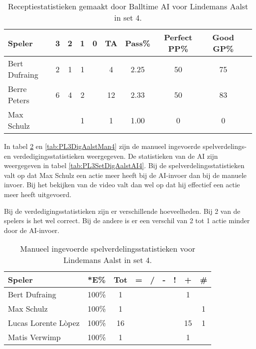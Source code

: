 \begin{table}[ht!]
  \centering
  \scriptsize
    \begin{tabular}{|l|c|c|c|c|c|c|c|c|c|} \hline
    \textbf{Speler} & 3 & 2 & 1 & 0 & TA & Pass\% & Perfect PP\% & Good GP\% \\ \hline
    Bert Dufraing & 2 & 1 & 1 &   & 4 & 2.25 & 50 & 75 \\  
    Berre Peters & 6 & 4 & 2 &  & 12 & 2.33 & 50 & 83 \\
    Max Schulz &   &  &  1 &  & 1 & 1.00 & 0 & 0 \\\hline
  \end{tabular}
  \caption[Receptiestatistieken gemaakt door Balltime AI voor Lindemans Aalst in set 4]{\label{tab:PL3ReceiveAalstAI4}Receptiestatistieken gemaakt door Balltime AI voor Lindemans Aalst in set 4.}
\end{table}

In tabel \ref{tab:PL3SetAalstMan4} en \ref{tab:PL3DigAalstMan4} zijn de manueel ingevoerde spelverdelings- en verdedigingsstatistieken weergegeven. De statistieken van de AI zijn weergegeven in tabel \ref{tab:PL3SetDigAalstAI4}.
Bij de spelverdelingsstatistieken valt op dat Max Schulz een actie meer heeft bij de AI-invoer dan bij de manuele invoer. Bij het bekijken van de video valt dan wel op dat hij effectief een actie meer heeft uitgevoerd. 

Bij de verdedigingsstatistieken zijn er verschillende hoeveelheden. Bij 2 van de spelers is het wel correct. Bij de andere is er een verschil van 2 tot 1 actie minder door de AI-invoer.

\begin{table}[ht!]
    \centering
    \scriptsize
    \begin{tabular}{|l|c|c|c|c|c|c|c|c|}
        \hline
        \textbf{Speler} & *E\% & Tot & = & / & - & ! & + & \# \\ \hline
        Bert Dufraing & 100\% & 1 &  &  &  & & 1 &  \\ 
        Max Schulz & 100\% & 1 &  &  &  & & & 1 \\ 
        Lucas Lorente Lòpez & 100\% & 16 &  &  &  &  & 15 & 1 \\ 
        Matis Verwimp &100\% & 1 & & & & & 1 & \\\hline
    \end{tabular}
    \caption[Manueel ingevoerde spelverdelingsstatistieken voor Lindemans Aalst in set 4]{\label{tab:PL3SetAalstMan4}Manueel ingevoerde spelverdelingsstatistieken voor Lindemans Aalst in set 4.}
\end{table}

